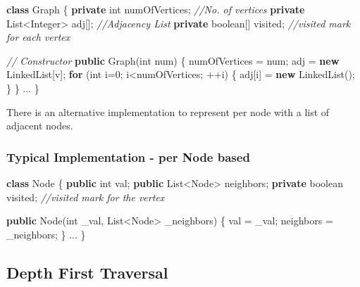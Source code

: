 \documentclass[]{book}
\newenvironment{Shaded}{\begin{snugshade}}{\end{snugshade}}
\newcommand{\BuiltInTok}[1]{#1}
\newcommand{\CommentTok}[1]{\textcolor[rgb]{0.56,0.35,0.01}{\textit{#1}}}
\newcommand{\DataTypeTok}[1]{\textcolor[rgb]{0.13,0.29,0.53}{#1}}
\newcommand{\DecValTok}[1]{\textcolor[rgb]{0.00,0.00,0.81}{#1}}
\newcommand{\FunctionTok}[1]{\textcolor[rgb]{0.00,0.00,0.00}{#1}}
\newcommand{\KeywordTok}[1]{\textcolor[rgb]{0.13,0.29,0.53}{\textbf{#1}}}
\newcommand{\NormalTok}[1]{#1}
\begin{document}
\begin{Shaded}
\begin{Highlighting}[]
\KeywordTok{class}\NormalTok{ Graph  \{}
    \KeywordTok{private} \DataTypeTok{int}\NormalTok{ numOfVertices;   }\CommentTok{//No. of vertices}
    \KeywordTok{private} \BuiltInTok{List}\NormalTok{<}\BuiltInTok{Integer}\NormalTok{> adj[]; }\CommentTok{//Adjacency List}
    \KeywordTok{private} \DataTypeTok{boolean}\NormalTok{[] visited;   }\CommentTok{//visited mark for each vertex}

    \CommentTok{// Constructor}
    \KeywordTok{public} \FunctionTok{Graph}\NormalTok{(}\DataTypeTok{int}\NormalTok{ num) \{}
\NormalTok{        numOfVertices = num;}
\NormalTok{        adj = }\KeywordTok{new} \BuiltInTok{LinkedList}\NormalTok{[v];}
        \KeywordTok{for}\NormalTok{ (}\DataTypeTok{int}\NormalTok{ i=}\DecValTok{0}\NormalTok{; i<numOfVertices; ++i) \{}
\NormalTok{            adj[i] = }\KeywordTok{new} \BuiltInTok{LinkedList}\NormalTok{();}
\NormalTok{        \}}
\NormalTok{    \}}
\NormalTok{    ...}
\NormalTok{\}}
\end{Highlighting}
\end{Shaded}

There is an alternative implementation to represent per node with a list of adjacent nodes.

\subsubsection{Typical Implementation - per Node based}

\begin{Shaded}
\begin{Highlighting}[]
\KeywordTok{class} \BuiltInTok{Node}\NormalTok{ \{}
    \KeywordTok{public} \DataTypeTok{int}\NormalTok{ val;}
    \KeywordTok{public} \BuiltInTok{List}\NormalTok{<}\BuiltInTok{Node}\NormalTok{> neighbors;}
    \KeywordTok{private} \DataTypeTok{boolean}\NormalTok{ visited;     }\CommentTok{//visited mark for the vertex}

    \KeywordTok{public} \BuiltInTok{Node}\NormalTok{(}\DataTypeTok{int}\NormalTok{ _val, }\BuiltInTok{List}\NormalTok{<}\BuiltInTok{Node}\NormalTok{> _neighbors) \{}
\NormalTok{        val = _val;}
\NormalTok{        neighbors = _neighbors;}
\NormalTok{    \}}
\NormalTok{    ...}
\NormalTok{\}}
\end{Highlighting}
\end{Shaded}

\hypertarget{depth-first-traversal-1}{%
\subsection{Depth First Traversal}\label{depth-first-traversal-1}}
\end{document}
